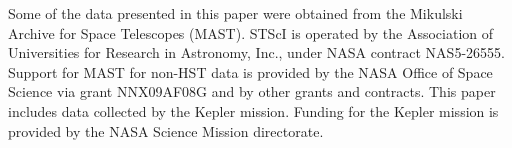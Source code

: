 \documentclass[useAMS, usenatbib, preprint, 12pt]{aastex}
\begin{document}














Some of the data presented in this paper were obtained from the Mikulski
Archive for Space Telescopes (MAST).
STScI is operated by the Association of Universities for Research in
Astronomy, Inc., under NASA contract NAS5-26555.
Support for MAST for non-HST data is provided by the NASA Office of Space
Science via grant NNX09AF08G and by other grants and contracts.
This paper includes data collected by the Kepler mission. Funding for the
Kepler mission is provided by the NASA Science Mission directorate.



\end{document}
